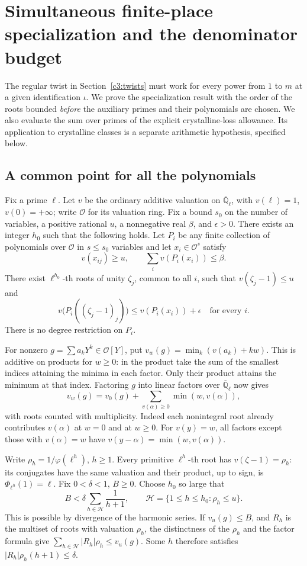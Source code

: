 \section{Simultaneous finite-place specialization and the denominator budget}
\label{sec:finite}\label{c4:finite-repairs}

The regular twist in Section~\ref{c3:twists} must work for every power from
\(1\) to \(m\) at a given identification \(\iota\).
We prove the specialization result with the order of the roots bounded
\emph{before} the auxiliary primes and their polynomials are chosen.
We also evaluate the sum over primes of the explicit crystalline-loss
allowance. Its application to crystalline classes is a separate arithmetic
hypothesis, specified below.

\subsection{A common point for all the polynomials}
\label{c4:root-spec}
Fix a prime \(\ell\). Let \(v\) be the ordinary additive valuation on
\(\overline{\mathbb Q}_\ell\), with \(v(\ell)=1\), \(v(0)=+\infty\);
write \(\mathcal O\) for its valuation ring. Fix a bound \(s_0\) on the
number of variables, a positive rational \(u\), a nonnegative real
\(\beta\), and \(\epsilon>0\). There exists an integer \(h_0\) such
that the following holds. Let \(P_i\) be any finite collection of
polynomials over \(\mathcal O\) in \(s\le s_0\) variables and let
\(x_i\in\mathcal O^s\) satisfy
\[
 v(x_{ij})\ge u,\qquad \sum_i v(P_i(x_i))\le\beta.
\]
There exist \(\ell^{h_0}\)-th roots of unity \(\zeta_j\), common to all
\(i\), such that \(v(\zeta_j-1)\le u\) and
\[
 v\bigl(P_i((\zeta_j-1)_j)\bigr)\le v(P_i(x_i))+\epsilon
 \quad\text{for every }i .
\]
There is no degree restriction on \(P_i\).

For nonzero \(g=\sum a_k Y^k\in\mathcal O[Y]\), put
\(v_w(g)=\min_k(v(a_k)+kw)\). This is additive on products for
\(w\ge0\): in the product take the sum of the smallest indices
attaining the minima in each factor. Only their product attains the
minimum at that index. Factoring \(g\) into linear factors over
\(\overline{\mathbb Q}_\ell\) now gives
\[
 v_w(g)=v_0(g)+\sum_{v(\alpha)\ge0}\min(w,v(\alpha)),
\]
with roots counted with multiplicity. Indeed each nonintegral root
already contributes \(v(\alpha)\) at \(w=0\) and at \(w\ge0\).
For \(v(y)=w\), all factors except those with \(v(\alpha)=w\)
have \(v(y-\alpha)=\min(w,v(\alpha))\).

Write \(\rho_h=1/\varphi(\ell^h)\), \(h\ge1\). Every primitive
\(\ell^h\)-th root has \(v(\zeta-1)=\rho_h\): its conjugates have
the same valuation and their product, up to sign, is
\(\Phi_{\ell^h}(1)=\ell\). Fix \(0<\delta<1\), \(B\ge0\).
Choose \(h_0\) so large that
\[
 B<\delta\sum_{h\in\mathcal H}\frac1{h+1},\qquad
 \mathcal H=\{1\le h\le h_0:\rho_h\le u\}.
\]
This is possible by divergence of the harmonic series. If
\(v_u(g)\le B\), and \(R_h\) is the multiset of roots with valuation
\(\rho_h\), the distinctness of the \(\rho_h\) and the factor formula
give \(\sum_{h\in\mathcal H}|R_h|\rho_h\le v_u(g)\).
Some \(h\) therefore satisfies \(|R_h|\rho_h(h+1)\le\delta\).

